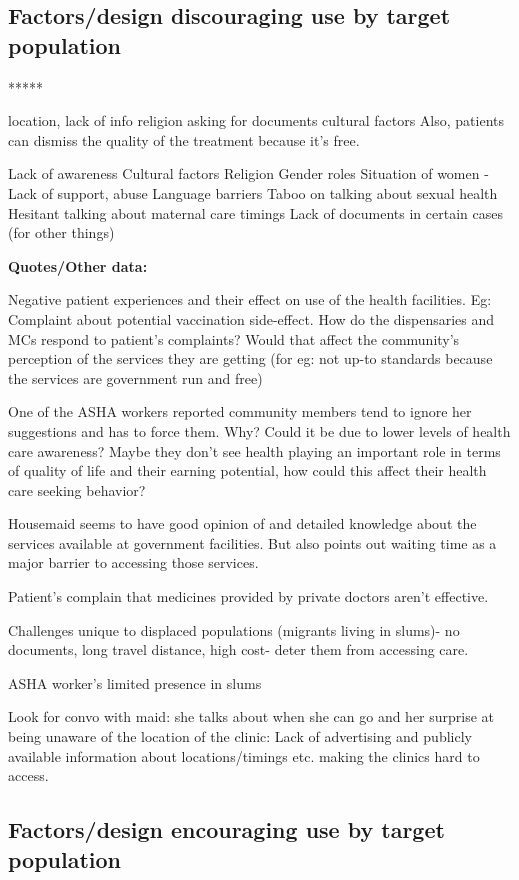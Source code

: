 \subsection{Factors/design discouraging use by target population}

*****

location, lack of info
religion
asking for documents
cultural factors
Also, patients can dismiss the quality of the treatment because it’s free.

Lack of awareness
Cultural factors
Religion
Gender roles
Situation of women - Lack of support, abuse
Language barriers
Taboo on talking about sexual health
Hesitant talking about maternal care
timings
Lack of documents in certain cases (for other things)

\textbf{Quotes/Other data:}

Negative patient experiences and their effect on use of the health facilities. Eg: Complaint about potential vaccination side-effect. How do the dispensaries and MCs respond to patient's complaints? Would that affect the community's perception of the services they are getting (for eg: not up-to standards because the services are government run and free)

One of the ASHA workers reported community members tend to ignore her suggestions and has to force them. Why? Could it be due to lower levels of health care awareness? Maybe they don't see health playing an important role in terms of quality of life and their earning potential, how could this affect their health care seeking behavior? 

Housemaid seems to have good opinion of and detailed knowledge about the services available at government facilities. But also points out waiting time as a major barrier to accessing those services.

Patient's complain that medicines provided by private doctors aren't effective. 

Challenges unique to displaced populations (migrants living in slums)- no documents, long travel distance, high cost- deter them from accessing care.

ASHA worker's limited presence in slums 

Look for convo with maid: she talks about when she can go and her surprise at being unaware of the location of the clinic: Lack of advertising and publicly available information about locations/timings etc.  making the clinics hard to access.

\subsection{Factors/design encouraging use by target population}

